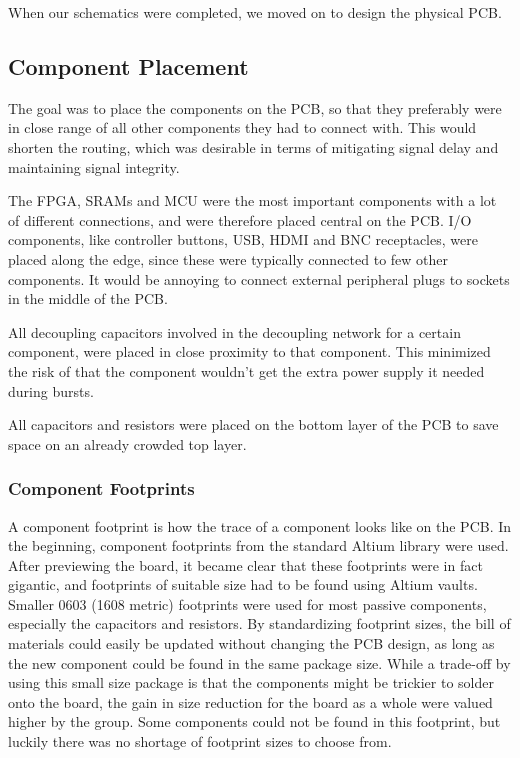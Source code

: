 When our schematics were completed, we moved on to design the physical PCB.

\subsection{Component Placement}
The goal was to place the components on the PCB, so that they preferably were in close range of all other components they had to connect with. 
This would shorten the routing, which was desirable in terms of mitigating signal delay and maintaining signal integrity.

The FPGA, SRAMs and MCU were the most important components with a lot of different connections, and were therefore placed central on the PCB.
I/O components, like controller buttons, USB, HDMI and BNC receptacles, were placed along the edge, since these were typically connected to few other components.
It would be annoying to connect external peripheral plugs to sockets in the middle of the PCB.

All decoupling capacitors involved in the decoupling network for a certain component, were placed in close proximity to that component.
This minimized the risk of that the component wouldn't get the extra power supply it needed during bursts.

All capacitors and resistors were placed on the bottom layer of the PCB to save space on an already crowded top layer.

\subsubsection{Component Footprints}
A component footprint is how the trace of a component looks like on the PCB.
In the beginning, component footprints from the standard Altium library were used.
After previewing the board, it became clear that these footprints were in fact gigantic, and footprints of suitable size had to be found using Altium vaults.
Smaller 0603 (1608 metric) footprints were used for most passive components, especially the capacitors and resistors.
By standardizing footprint sizes, the bill of materials could easily be updated without changing the PCB design, as long as the new component could be found in the same package size.
While a trade-off by using this small size package is that the components might be trickier to solder onto the board, the gain in size reduction for the board as a whole were valued higher by the group.
Some components could not be found in this footprint, but luckily there was no shortage of footprint sizes to choose from.

